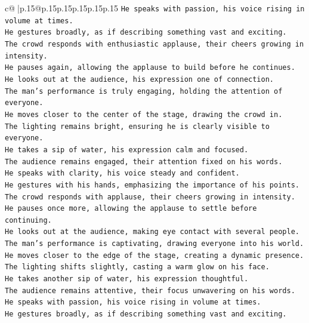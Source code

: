 \documentclass{article}
\begin{document}
{\begin{supertabular}{c@{$\;$}|p{.15\linewidth}@{}p{.15\linewidth}p{.15\linewidth}p{.15\linewidth}p{.15\linewidth}p{.15\linewidth}}
{{{\texttt{He speaks with passion, his voice rising in volume at times.  } \\
\texttt{He gestures broadly, as if describing something vast and exciting.  } \\
\texttt{The crowd responds with enthusiastic applause, their cheers growing in intensity.  } \\
\texttt{He pauses again, allowing the applause to build before he continues.  } \\
\texttt{He looks out at the audience, his expression one of connection.  } \\
\texttt{The man's performance is truly engaging, holding the attention of everyone.  } \\
\texttt{He moves closer to the center of the stage, drawing the crowd in.  } \\
\texttt{The lighting remains bright, ensuring he is clearly visible to everyone.  } \\
\texttt{He takes a sip of water, his expression calm and focused.  } \\
\texttt{The audience remains engaged, their attention fixed on his words.  } \\
\texttt{He speaks with clarity, his voice steady and confident.  } \\
\texttt{He gestures with his hands, emphasizing the importance of his points.  } \\
\texttt{The crowd responds with applause, their cheers growing in intensity.  } \\
\texttt{He pauses once more, allowing the applause to settle before continuing.  } \\
\texttt{He looks out at the audience, making eye contact with several people.  } \\
\texttt{The man's performance is captivating, drawing everyone into his world.  } \\
\texttt{He moves closer to the edge of the stage, creating a dynamic presence.  } \\
\texttt{The lighting shifts slightly, casting a warm glow on his face.  } \\
\texttt{He takes another sip of water, his expression thoughtful.  } \\
\texttt{The audience remains attentive, their focus unwavering on his words.  } \\
\texttt{He speaks with passion, his voice rising in volume at times.  } \\
\texttt{He gestures broadly, as if describing something vast and exciting.  } \\
}}}
\end{supertabular}}
\end{document}
